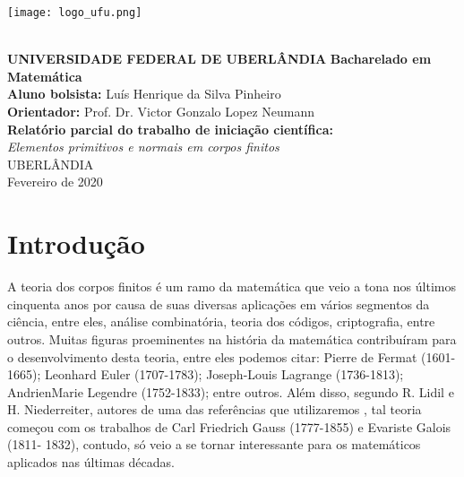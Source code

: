 \documentclass[12pt,twoside]{article}
\begin{document}

  \begin{titlepage}
    \begin{center}
      \parbox{3.5cm}{\texttt{[image: logo\_ufu.png]}} \\
      \vspace{1cm}
      {\Large \bf UNIVERSIDADE FEDERAL DE UBERLÂNDIA}
      {\large \bf Bacharelado em Matemática} \\
      \vspace{2cm}
      {\large \textbf{Aluno bolsista:} Luís Henrique da Silva Pinheiro} \\
      {\large \textbf{Orientador:} Prof. Dr. Victor Gonzalo Lopez Neumann} \\
      \vspace{3cm}
      {\Large \bf Relatório parcial do trabalho de iniciação científica:} \\
      {\large \it Elementos primitivos e normais em corpos finitos} \\
      \vspace{8cm}
      {UBERLÂNDIA \\ Fevereiro de 2020}
    \end{center}
  \end{titlepage}

  \tableofcontents %
  \thispagestyle{empty} %
  \newpage %


  \section{Introdução}
    A teoria dos corpos finitos é um ramo da matemática que veio a tona nos
    últimos cinquenta anos por causa de suas diversas aplicações em vários segmentos
    da ciência, entre eles, análise combinatória, teoria dos códigos, criptografia, entre
    outros. Muitas figuras proeminentes na história da matemática contribuíram para o
    desenvolvimento desta teoria, entre eles podemos citar: Pierre de Fermat (1601-
    1665); Leonhard Euler (1707-1783); Joseph-Louis Lagrange (1736-1813); AndrienMarie Legendre (1752-1833); 
    entre outros. Além disso, segundo R. Lidil e H.
    Niederreiter, autores de uma das referências que utilizaremos \cite{finite-fields-1997}, tal teoria começou
    com os trabalhos de Carl Friedrich Gauss (1777-1855) e Evariste Galois (1811-
    1832), contudo, só veio a se tornar interessante para os matemáticos aplicados nas
    últimas décadas. \\
    
\end{document}
